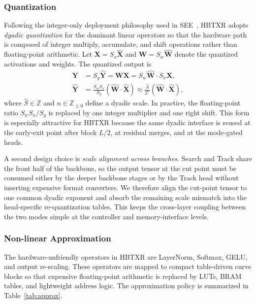 \documentclass[journal]{IEEEtran}
\begin{document}
\subsubsection{Quantization}
Following the integer-only deployment philosophy used in SEE~\cite{ref9}, HBTXR adopts \emph{dyadic quantization} for the dominant linear operators so that the hardware path is composed of integer multiply, accumulate, and shift operations rather than floating-point arithmetic. Let $\mathbf X=S_x\hat{\mathbf X}$ and $\mathbf W=S_w\hat{\mathbf W}$ denote the quantized activations and weights. The quantized output is
\begin{align}
\mathbf Y &= S_y\hat{\mathbf Y} = \mathbf W\mathbf X
          = S_w\hat{\mathbf W}\cdot S_x\hat{\mathbf X},\\
\hat{\mathbf Y}
&= \frac{S_wS_x}{S_y}\left(\hat{\mathbf W}\cdot\hat{\mathbf X}\right)
 \approx \frac{\hat S}{2^n}
 \left(\hat{\mathbf W}\cdot\hat{\mathbf X}\right),
\end{align}
where $\hat S \in \mathbb Z$ and $n\in \mathbb Z_{\ge 0}$ define a dyadic scale. In practice, the floating-point ratio $S_wS_x/S_y$ is replaced by one integer multiplier and one right shift. This form is especially attractive for HBTXR because the same dyadic interface is reused at the early-exit point after block $L/2$, at residual merges, and at the mode-gated heads.

A second design choice is \emph{scale alignment across branches}. Search and Track share the front half of the backbone, so the output tensor at the cut point must be consumed either by the deeper backbone stages or by the Track head without inserting expensive format converters. We therefore align the cut-point tensor to one common dyadic exponent and absorb the remaining scale mismatch into the head-specific re-quantization tables. This keeps the cross-layer coupling between the two modes simple at the controller and memory-interface levels.

\subsubsection{Non-linear Approximation}
The hardware-unfriendly operators in HBTXR are LayerNorm, Softmax, GELU, and output re-scaling. These operators are mapped to compact table-driven curve blocks so that expensive floating-point arithmetic is replaced by LUTs, BRAM tables, and lightweight address logic. The approximation policy is summarized in Table~\ref{tab:approx}.
\end{document}
